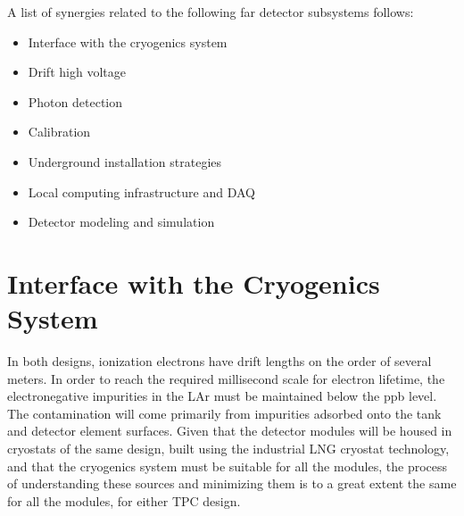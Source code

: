 A list of synergies related to the following far detector subsystems
follows:

\begin{itemize}
\item Interface with the cryogenics system
\item Drift high voltage 
\item Photon detection
\item Calibration
\item Underground installation strategies
\item Local computing infrastructure and DAQ
\item Detector modeling and simulation
\end{itemize}

  


\section{Interface with the Cryogenics System}

In both designs, ionization electrons have drift lengths on the order
of several meters. In order to reach the required millisecond scale for
electron lifetime, the electronegative impurities in the LAr must be
maintained below the ppb level. The contamination will
come primarily from impurities adsorbed onto the tank and detector element surfaces.
Given that the detector modules will be housed in cryostats of the same design, built
using the industrial LNG cryostat technology, and that the cryogenics system must
be suitable for all the modules, the process of understanding these sources and minimizing them
is to a great extent the same for all the modules, for either TPC design. 

